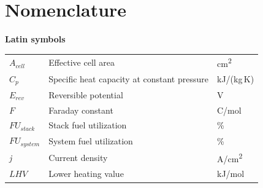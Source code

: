 \documentclass[a4paper,10pt]{cas-dc} %
\begin{document}
\section*{Nomenclature}

\setlength{\tabcolsep}{2pt}%
\renewcommand{\arraystretch}{1.20}%
\footnotesize

\noindent\textbf{Latin symbols}\\[2pt]
\noindent\begin{tabular}{@{}
  >{\raggedright\arraybackslash}p{}
  >{\raggedright\arraybackslash}p{}
  >{\raggedright\arraybackslash}p{}@{}}
\(A_{cell}\) & Effective cell area & cm\textsuperscript{2} \\
\(C_{p}\) & Specific heat capacity at constant pressure & kJ/(kg\,K) \\
\(E_{rev}\) & Reversible potential & V \\
\(F\) & Faraday constant & C/mol \\
\({FU}_{stack}\) & Stack fuel utilization & \% \\
\({FU}_{system}\) & System fuel utilization & \% \\
\emph{j} & Current density & A/cm\textsuperscript{2} \\
\({LHV}\) & Lower heating value & kJ/mol \\
\end{tabular}
\end{document}
